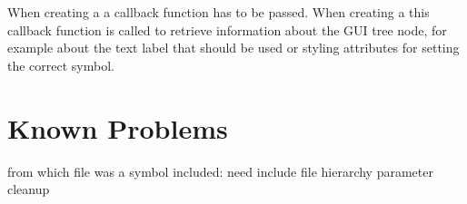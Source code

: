 When creating a  a callback function has to be passed. When creating a  this callback function is called to retrieve information about the GUI tree node, for example about the text label that should be used or styling attributes for setting the correct symbol.

\section{Known Problems}

from which file was a symbol included: need include file hierarchy
parameter cleanup


